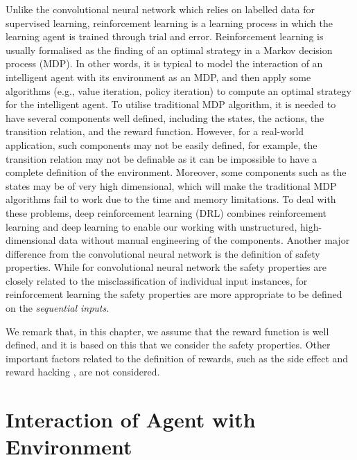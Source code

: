 %
Unlike the convolutional neural network 
which relies on labelled data for supervised learning, reinforcement learning is a learning process in which the learning agent is trained through trial and error. Reinforcement learning is usually formalised as the finding of an optimal strategy in a Markov decision process (MDP). In other words, it is typical to model the interaction of an intelligent agent with its environment as an MDP, and then apply some algorithms (e.g., value iteration, policy iteration) to compute an optimal strategy for the intelligent agent. 
%
To utilise traditional MDP algorithm, it is needed to have several components well defined, including the states, the actions, the transition relation, and the reward function. However, for a real-world application, such components may not be easily defined, for example, the transition relation may not be definable as it can be impossible to have a complete definition of the environment. Moreover, some components such as the states may be of very high dimensional, which will make the traditional MDP algorithms fail to work due to the time and memory limitations. To deal with these problems, deep reinforcement learning (DRL) combines reinforcement learning and deep learning to enable our working with unstructured, high-dimensional data without manual engineering of the components. 
%
Another major difference from the convolutional neural network is the definition of safety properties. While for convolutional neural network the safety properties are closely related to the misclassification of individual input instances, for reinforcement learning the safety properties are more appropriate to be defined on the \emph{sequential inputs}.



We remark that, in this chapter, we assume that the reward function is well defined, and it is based on this that we consider the safety properties. Other important factors related to the definition of rewards, such as the side effect and reward hacking \cite{DBLP:journals/corr/AmodeiOSCSM16}, are not considered. 

\section{Interaction of Agent with Environment}\label{sec:mdp}



